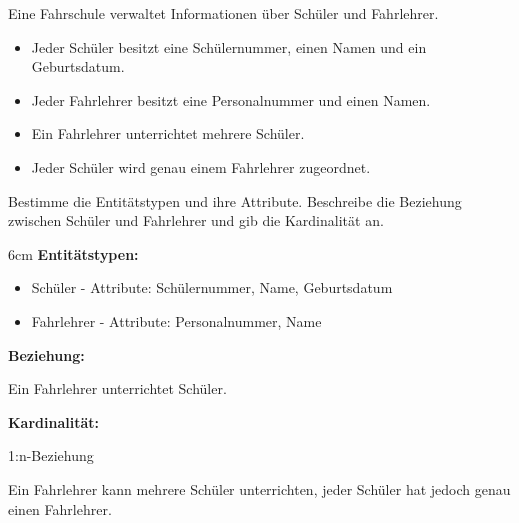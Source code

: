 \question[4]
Eine Fahrschule verwaltet Informationen über Schüler und Fahrlehrer.

\begin{itemize}
\item Jeder Schüler besitzt eine Schülernummer, einen Namen und ein Geburtsdatum.
\item Jeder Fahrlehrer besitzt eine Personalnummer und einen Namen.
\item Ein Fahrlehrer unterrichtet mehrere Schüler.
\item Jeder Schüler wird genau einem Fahrlehrer zugeordnet.
\end{itemize}

Bestimme die Entitätstypen und ihre Attribute.
Beschreibe die Beziehung zwischen Schüler und Fahrlehrer und gib die Kardinalität an.

\begin{solutionbox}{6cm}
\textbf{Entitätstypen:}
\begin{itemize}
\item Schüler - Attribute: Schülernummer, Name, Geburtsdatum
\item Fahrlehrer - Attribute: Personalnummer, Name
\end{itemize}

\textbf{Beziehung:}

Ein Fahrlehrer unterrichtet Schüler.

\textbf{Kardinalität:}

1:n-Beziehung

Ein Fahrlehrer kann mehrere Schüler unterrichten, jeder Schüler hat jedoch genau einen Fahrlehrer.
\end{solutionbox}